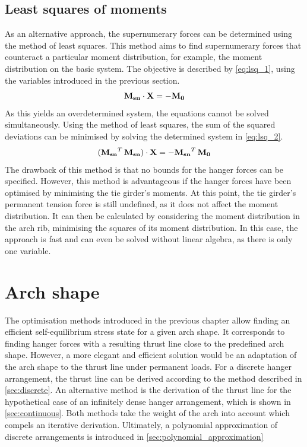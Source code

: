 \subsection{Least squares of moments} \label{sec:least_squares}
As an alternative approach, the supernumerary forces can be determined using the method of least squares. This method aims to find supernumerary forces that counteract a particular moment distribution, for example, the moment distribution on the basic system. The objective is described by \cref{eq:lsq_1}, using the variables introduced in the previous section.
\begin{equation}
    {\bf M_{sn}} \cdot {\bf X} = -{\bf M_0}
    \label{eq:lsq_1}
\end{equation}
As this yields an overdetermined system, the equations cannot be solved simultaneously. Using the method of least squares, the sum of the squared deviations can be minimised by solving the determined system in \cref{eq:lsq_2}.
\begin{equation}
    ({\bf M_{sn}}^T\,{\bf M_{sn}}) \cdot {\bf X} = -{\bf M_{sn}}^T\,{\bf M_0}
    \label{eq:lsq_2}
\end{equation}
The drawback of this method is that no bounds for the hanger forces can be specified. However, this method is advantageous if the hanger forces have been optimised by minimising the tie girder's moments. At this point, the tie girder's permanent tension force is still undefined, as it does not affect the moment distribution. It can then be calculated by considering the moment distribution in the arch rib, minimising the squares of its moment distribution. In this case, the approach is fast and can even be solved without linear algebra, as there is only one variable.


\newpage
\section{Arch shape} \label{sec:met_arch}
The optimisation methods introduced in the previous chapter allow finding an efficient self-equilibrium stress state for a given arch shape. It corresponds to finding hanger forces with a resulting thrust line close to the predefined arch shape. However, a more elegant and efficient solution would be an adaptation of the arch shape to the thrust line under permanent loads. 
For a discrete hanger arrangement, the thrust line can be derived according to the method described in \cref{sec:discrete}. 
An alternative method is the derivation of the thrust line for the hypothetical case of an infinitely dense hanger arrangement, which is shown in \cref{sec:continuous}.
Both methods take the weight of the arch into account which compels an iterative derivation.
Ultimately, a polynomial approximation of discrete arrangements is introduced in \cref{sec:polynomial_approximation}

